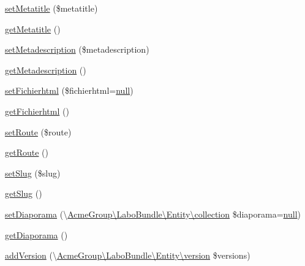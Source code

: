 \begin{DoxyCompactItemize}
\hyperlink{class_acme_group_1_1_labo_bundle_1_1_entity_1_1pageweb_aba1e46885b7ab6c8dfeb3a9866904ba1}{set\+Metatitle} (\$metatitle)
\item 
\hyperlink{class_acme_group_1_1_labo_bundle_1_1_entity_1_1pageweb_a2c792ba28535e83fcb116727856c78bd}{get\+Metatitle} ()
\item 
\hyperlink{class_acme_group_1_1_labo_bundle_1_1_entity_1_1pageweb_a129b5a29edf93231379c0b1827091107}{set\+Metadescription} (\$metadescription)
\item 
\hyperlink{class_acme_group_1_1_labo_bundle_1_1_entity_1_1pageweb_ad85a170bddaa852211289fcb72b9e1e5}{get\+Metadescription} ()
\item 
\hyperlink{class_acme_group_1_1_labo_bundle_1_1_entity_1_1pageweb_aa8c4e343fe0ae5be9f80c7a7b28e6414}{set\+Fichierhtml} (\$fichierhtml=\hyperlink{validate_8js_afb8e110345c45e74478894341ab6b28e}{null})
\item 
\hyperlink{class_acme_group_1_1_labo_bundle_1_1_entity_1_1pageweb_a5facdfaa079856a9cae620f482f17285}{get\+Fichierhtml} ()
\item 
\hyperlink{class_acme_group_1_1_labo_bundle_1_1_entity_1_1pageweb_af3c25bbab67447e812d47a6223d07199}{set\+Route} (\$route)
\item 
\hyperlink{class_acme_group_1_1_labo_bundle_1_1_entity_1_1pageweb_a6683204d2b2dd1233084a8a72aa0ffc8}{get\+Route} ()
\item 
\hyperlink{class_acme_group_1_1_labo_bundle_1_1_entity_1_1pageweb_a5f92655c98d14b02a7a7a6f3c877db9b}{set\+Slug} (\$slug)
\item 
\hyperlink{class_acme_group_1_1_labo_bundle_1_1_entity_1_1pageweb_a6a2adaf3db050a09c541dccf1e08a8db}{get\+Slug} ()
\item 
\hyperlink{class_acme_group_1_1_labo_bundle_1_1_entity_1_1pageweb_a8113a22b5c1b3ded6f77f80083ffa076}{set\+Diaporama} (\textbackslash{}\hyperlink{class_acme_group_1_1_labo_bundle_1_1_entity_1_1collection}{Acme\+Group\textbackslash{}\+Labo\+Bundle\textbackslash{}\+Entity\textbackslash{}collection} \$diaporama=\hyperlink{validate_8js_afb8e110345c45e74478894341ab6b28e}{null})
\item 
\hyperlink{class_acme_group_1_1_labo_bundle_1_1_entity_1_1pageweb_aea9b80b5f8b1812d53262cf9940855ec}{get\+Diaporama} ()
\item 
\hyperlink{class_acme_group_1_1_labo_bundle_1_1_entity_1_1pageweb_a49fb6c0a05f513f63f087b9e7d7934c6}{add\+Version} (\textbackslash{}\hyperlink{class_acme_group_1_1_labo_bundle_1_1_entity_1_1version}{Acme\+Group\textbackslash{}\+Labo\+Bundle\textbackslash{}\+Entity\textbackslash{}version} \$versions)

\end{DoxyCompactItemize}
